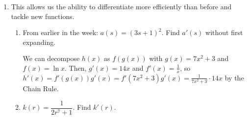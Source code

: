 \documentclass{article}
\makeatletter
\newlength{\tipmargin}
\renewenvironment{framed}{
  \setlength{\tipmargin}{\textwidth-\linewidth}
  \advance\@totalleftmargin-\tipmargin
  \def\FrameCommand{\hspace{\tipmargin}\fbox}%
  \advance\linewidth\tipmargin
  \MakeFramed {\advance\hsize-\width \FrameRestore}%
}
{\endMakeFramed}
\makeatother
\begin{document}
\begin{enumerate}
\begin{enumerate}
Let $h = f(v)$, that is, height is a function of volume. Let $v=g(t)$, that is, volume is a function of time. Given these formal definitions, we could now describe the relationship between height and time as a composition, written $h=f(g(t))$. In which case, the same calculation to find how height is changing with respect to time could be written:

$$\frac{d}{dt} f(g(t)) = \fitb{1in}{f'(g(t))}\cdot \fitb{1in}{g'(t)} $$

\begin{problemonly}
 \vspace{.5in}
 \end{problemonly}

  \end{enumerate}



\begin{framed}
    \textbf{The Chain Rule:} Given a composition of functions $f(g(t))$, the derivative is:
    $$\dfrac{d}{dt}[f(g(t))]= \solonly{f'(g(t))\cdot g'(t) }
    \hspace{1.5 in} \text{or} \hspace{.5 in} \dfrac{df}{dt} = 
    \solonly{\dfrac{df}{dg} \cdot \dfrac{dg}{dt}}
    $$ 
\end{framed}

\pspace{\newpage}

\item 
  
  This allows us the ability to differentiate more efficiently than before and tackle new functions.
  \begin{enumerate}

  \item

     \begin{problem}[\stretch{0.5}]
      From earlier in the week: $a(s) = (3s + 1)^2$. Find $a'(s)$ without first expanding.
    \end{problem}

    \begin{solution}
      We can decompose $h(x)$ as $f(g(x))$ with $g(x) = 7x^2 + 3$ and
      $f(x) = \ln x$.  Then, $g'(x) = 14 x$ and $f'(x) = \frac{1}{x}$, so
      $h'(x) = f'(g(x)) g'(x) = f'(7x^2 + 3) g'(x) = \boxed{\frac{1}{7x^2
          + 3} \cdot 14x}$ by the Chain Rule. 
    \end{solution}

\item $k(r)=\dfrac{1}{2r^7+1}$. Find $k'(r)$.
\begin{problemonly}
    \vfill
\end{problemonly}


\end{enumerate}
\end{enumerate}
\end{document}
